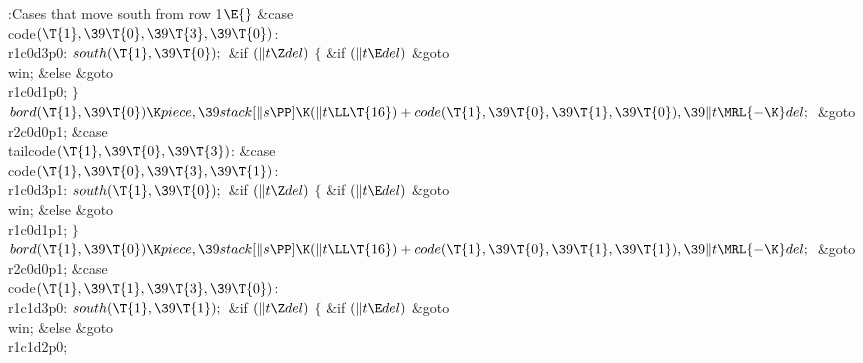 \B{}:Cases that move south from row 1\X${}\E{}$\6
\4\&{case} \\{code}${}(\T{1},\39\T{0},\39\T{3},\39\T{0}){}$:\5
\\{r1c0d3p0}:\5
${}\\{south}(\T{1},\39\T{0});{}$\6
\&{if} ${}(\|t\Z\\{del}){}$\5
${}\{{}$\5
\1\&{if} ${}(\|t\E\\{del}){}$\1\5
\&{goto} \\{win};\5
\2\&{else}\1\5
\&{goto} \\{r1c0d1p0};\5
\2${}\}{}$\2\6
${}\\{bord}(\T{1},\39\T{0})\K\\{piece},\39\\{stack}[\|s\PP]\K(\|t\LL\T{16})+%
\\{code}(\T{1},\39\T{0},\39\T{1},\39\T{0}),\39\|t\MRL{-{\K}}\\{del};{}$\6
\&{goto} \\{r2c0d0p1};\6
\4\&{case} \\{tailcode}${}(\T{1},\39\T{0},\39\T{3}){}$:\5
\&{case} \\{code}${}(\T{1},\39\T{0},\39\T{3},\39\T{1}){}$:\5
\\{r1c0d3p1}:\5
${}\\{south}(\T{1},\39\T{0});{}$\6
\&{if} ${}(\|t\Z\\{del}){}$\5
${}\{{}$\5
\1\&{if} ${}(\|t\E\\{del}){}$\1\5
\&{goto} \\{win};\5
\2\&{else}\1\5
\&{goto} \\{r1c0d1p1};\5
\2${}\}{}$\2\6
${}\\{bord}(\T{1},\39\T{0})\K\\{piece},\39\\{stack}[\|s\PP]\K(\|t\LL\T{16})+%
\\{code}(\T{1},\39\T{0},\39\T{1},\39\T{1}),\39\|t\MRL{-{\K}}\\{del};{}$\6
\&{goto} \\{r2c0d0p1};\6
\4\&{case} \\{code}${}(\T{1},\39\T{1},\39\T{3},\39\T{0}){}$:\5
\\{r1c1d3p0}:\5
${}\\{south}(\T{1},\39\T{1});{}$\6
\&{if} ${}(\|t\Z\\{del}){}$\5
${}\{{}$\5
\1\&{if} ${}(\|t\E\\{del}){}$\1\5
\&{goto} \\{win};\5
\2\&{else}\1\5
\&{goto} \\{r1c1d2p0};\5
